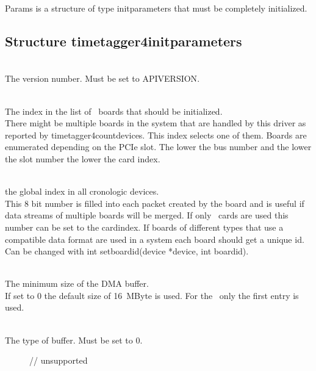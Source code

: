 		Params is a structure of type \textsf{\prefix init\tu parameters} that must be completely initialized.\par

		\subsection{Structure timetagger4\tu init\tu parameters}
			\\
			The version number. Must be set to \textsf{\PREFIX API\tu VERSION}.\par

			\\
			The index in the list of \deviceName\ boards that should be initialized.\\
			There might be multiple boards in the system that are handled by this driver as reported by \textsf{timetagger4\tu count\tu devices}. This index selects one of them. Boards are enumerated depending on the PCIe slot. 
			The lower the bus number and the lower the slot number the lower the card index.\par

			\\
			the global index in all cronologic devices.\\
			This 8 bit number is filled into each packet created by the board and is useful if data streams of multiple boards will be merged. If only \deviceName\ cards are used this number can be set to the \textsf{card\tu index}. 
			If boards of different types that use a compatible data format are used in a system each board should get a unique id.
			Can be changed with \textsf{int \prefix set\tu board\tu id\allowbreak(\prefix device *device, int board\tu id)}.\par

			\\
			The minimum size of the DMA buffer.\\
			If set to 0 the default size of 16~MByte is used. For the \deviceName\ only the first entry is used.\par

			\\
			The type of buffer. Must be set to 0.
			\begin{description}
				\item[]  
				\item[]    // unsupported
			\end{description}

